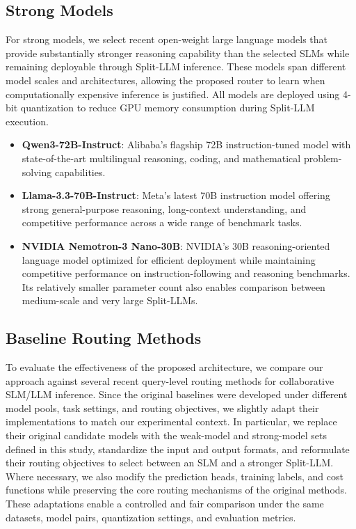 \documentclass[lettersize,journal]{IEEEtran}
\begin{document}
\subsection{Strong Models}
For strong models, we select recent open-weight large language models that provide substantially stronger reasoning capability than the selected SLMs while remaining deployable through Split-LLM inference. These models span different model scales and architectures, allowing the proposed router to learn when computationally expensive inference is justified. All models are deployed using 4-bit quantization to reduce GPU memory consumption during Split-LLM execution.

\begin{itemize}
    \item \textbf{Qwen3-72B-Instruct}: Alibaba's flagship 72B instruction-tuned model with state-of-the-art multilingual reasoning, coding, and mathematical problem-solving capabilities.

    \item \textbf{Llama-3.3-70B-Instruct}: Meta's latest 70B instruction model offering strong general-purpose reasoning, long-context understanding, and competitive performance across a wide range of benchmark tasks.

    \item \textbf{NVIDIA Nemotron-3 Nano-30B}: NVIDIA's 30B reasoning-oriented language model optimized for efficient deployment while maintaining competitive performance on instruction-following and reasoning benchmarks. Its relatively smaller parameter count also enables comparison between medium-scale and very large Split-LLMs.
\end{itemize}

\subsection{Baseline Routing Methods}
To evaluate the effectiveness of the proposed architecture, we compare our approach against several recent query-level routing methods for collaborative SLM/LLM inference. Since the original baselines were developed under different model pools, task settings, and routing objectives, we slightly adapt their implementations to match our experimental context. In particular, we replace their original candidate models with the weak-model and strong-model sets defined in this study, standardize the input and output formats, and reformulate their routing objectives to select between an SLM and a stronger Split-LLM. Where necessary, we also modify the prediction heads, training labels, and cost functions while preserving the core routing mechanisms of the original methods. These adaptations enable a controlled and fair comparison under the same datasets, model pairs, quantization settings, and evaluation metrics.
\end{document}
